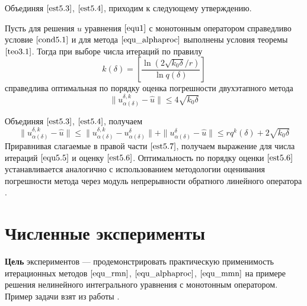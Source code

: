 Объединяя $\eqref{est5.3}$, $\eqref{est5.4}$, приходим к следующему утверждению.
\begin{theorem}\label{teo5.1}
	Пусть для решения $\hat{u}$ уравнения $\eqref{equ1}$ с монотонным оператором справедливо условие $\eqref{cond5.1}$ и для метода $\eqref{equ_alphaproc}$ выполнены условия теоремы $\ref{teo3.1}$. Тогда при выборе числа итераций по правилу
	\begin{equation}\label{equ5.5}
	k(\delta)=\left[\frac{\ln(2\sqrt{k_0\delta}/r)}{\ln q(\delta)}\right]
	\end{equation}
	справедлива оптимальная по порядку оценка погрешности двухэтапного метода
	\begin{equation}\label{est5.6}
	\|u_{\alpha(\delta)}^{\delta, k}-\hat{u}\|\le 4\sqrt{k_0 \delta}
	\end{equation}
\end{theorem}
\proof Объединяя $\eqref{est5.3}$, $\eqref{est5.4}$, получаем
\begin{equation}\label{est5.7}
\|u_{\alpha(\delta)}^{\delta, k}-\hat{u}\|\le\|u_{\alpha(\delta)}^{\delta, k}-u_{\alpha(\delta)}^{\delta}\|+\|u_{\alpha(\delta)}^{\delta}-\hat{u}\|\le rq^k(\delta)+ 2\sqrt{k_0\delta}
\end{equation}
Приравнивая слагаемые в правой части $\eqref{est5.7}$, получаем выражение для числа итераций $\eqref{equ5.5}$ и оценку $\eqref{est5.6}$. Оптимальность по порядку оценки $\eqref{est5.6}$ устанавливается аналогично \cite{Vasin2015} с использованием методологии оценивания погрешности метода через модуль непрерывности обратного линейного оператора \cite{Ivanov1974, IvaVasTan2002}.

\newpage
\section{Численные эксперименты}

{\bfseries Цель} экспериментов --- продемонстрировать практическую применимость итерационных методов $\eqref{equ_rmn}$, $\eqref{equ_alphaproc}$, $\eqref{equ_mmn}$ на примере решения нелинейного интегрального уравнения с монотонным оператором. Пример задачи взят из работы \cite{Tau2002}.

